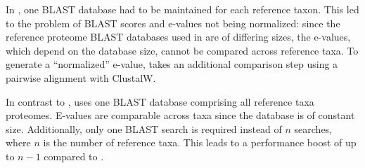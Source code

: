 In \hamstr, one BLAST database had to be maintained for each reference taxon.
This led to the problem of BLAST scores and e-values not being normalized: since
the reference proteome BLAST databases used in \hamstr are of differing sizes,
the e-values, which depend on the database size, cannot be compared across
reference taxa. To generate a ``normalized'' e-value, \hamstr takes an
additional comparison step using a pairwise alignment with ClustalW.

In contrast to \hamstr, \pname uses one BLAST database comprising all reference
taxa proteomes. E-values are comparable across taxa since the database is of
constant size. Additionally, only one BLAST search is required instead of $n$
searches, where $n$ is the number of reference taxa. This leads to a performance
boost of up to $n-1$ compared to \hamstr.
